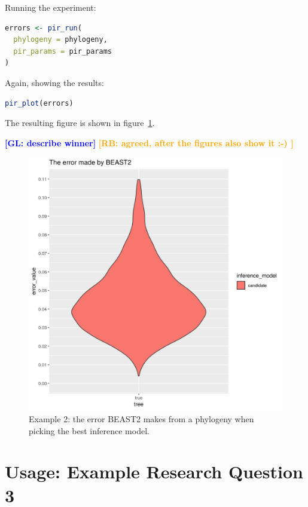 \documentclass{article}
\newcommand{\giovanni}[1]{\textcolor{blue}{\textbf{[GL: #1]}}}
\newcommand{\richel}[1]{\textcolor{orange}{\textbf{[RB: #1]}}}
\begin{document}
Running the experiment:

\begin{lstlisting}[language=R, floatplacement=ht, frame=single]
errors <- pir_run(
  phylogeny = phylogeny,
  pir_params = pir_params
)
\end{lstlisting}

Again, showing the results:

\begin{lstlisting}[language=R, floatplacement=ht, frame=single]
pir_plot(errors)
\end{lstlisting}

The resulting figure is shown in figure~\ref{fig:example_2}.

\giovanni{describe winner}
\richel{agreed, after the figures also show it :-) }

\begin{figure}[ht]
  \includegraphics[width=\textwidth]{example_2_errors.png}
  \caption{
    Example 2: the error BEAST2 makes from a phylogeny when
    picking the best inference model.
  }
  \label{fig:example_2}
\end{figure}

\section{Usage: Example Research Question 3}
\end{document}
